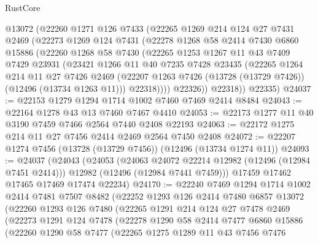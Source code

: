 \begin{lexlean}{RustCore}
\begin{coremodule}
      @13072
      (@22260
        @1271
        @126
        @7433
        (@22265
          @1269
          @214
          @124
          @27
          @7431
          @2469
          (@22273
            @1269
            @124
            @7431
            (@22278
              @1268
              @58
              @2414
              @7430
              @6860
              @15886
              (@22260
                @1268
                @58
                @7430
                (@22265
                  @1253
                  @1267
                  @11
                  @43
                  @7409
                  @7429
                  @23931
                  (@23421
                    @1266
                    @11
                    @40
                    @7235
                    @7428
                    @23435
                    (@22265
                      @1264
                      @214
                      @11
                      @27
                      @7426
                      @2469
                      (@22207 @1263 @7426 (@13728 (@13729 @7426)) (@12496 (@13734 @1263 @11)))
                      @22318))))
              @22326))
          @22318))
      @22335)
@24037 := @22153 @1279 @1294 @1714 @1002 @7460 @7469 @2414 @8484
@24043 := @22164 @1278 @43 @13 @7460 @7467 @4410
@24053 := @22173 @1277 @11 @40 @3190 @7459 @7466 @2564 @7440 @2408 @22193
@24063 := @22172 @1275 @214 @11 @27 @7456 @2414 @2469 @2564 @7450 @2408
@24072 := @22207 @1274 @7456 (@13728 (@13729 @7456)) (@12496 (@13734 @1274 @11))
@24093 := @24037
    (@24043
      (@24053
        (@24063 @24072 @22214 @12982 (@12496 (@12984 @7451 @2414)))
        @12982
        (@12496 (@12984 @7441 @7459)))
      @17459
      @17462
      @17465
      @17469
      @17474
      @22234)
@24170 := @22240
    @7469
    @1294
    @1714
    @1002
    @2414
    @7481
    @7507
    @8482
    (@22252
      @1293
      @126
      @2414
      @7480
      @6857
      @13072
      (@22260
        @1293
        @126
        @7480
        (@22265
          @1291
          @214
          @124
          @27
          @7478
          @2469
          (@22273
            @1291
            @124
            @7478
            (@22278
              @1290
              @58
              @2414
              @7477
              @6860
              @15886
              (@22260
                @1290
                @58
                @7477
                (@22265
                  @1275
                  @1289
                  @11
                  @43
                  @7456
                  @7476

\end{coremodule}
\end{lexlean}
